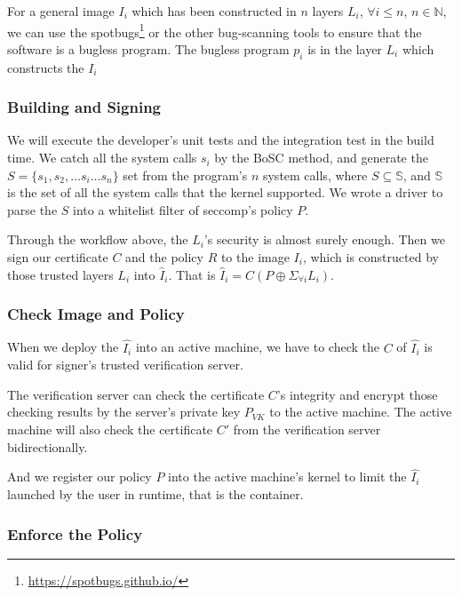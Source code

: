 For a general image $I_i$ which has been constructed in $n$ layers $L_i$,
$\forall i \le n$, $n \in \mathbb{N}$, we can use the spotbugs\footnote{\url{https://spotbugs.github.io/}}
or the other bug-scanning tools to ensure that the software is a bugless program.
The bugless program $p_i$ is in the layer $L_i$ which constructs the $I_i$

\subsubsection{Building and Signing}

We will execute the developer's unit tests and the integration test in the build time.
We catch all the system calls $s_i$ by the BoSC \cite{1495942} method,
and generate the $S = \{s_1, s_2, \dots s_i \dots s_n\}$ set from the
program's $n$ system calls, where $S \subseteq \mathbb{S}$, and $\mathbb{S}$ is the set of
all the system calls that the kernel supported.  We wrote a driver to parse the $S$ into
a whitelist filter of seccomp's policy $P$.


Through the workflow above, the $L_i$'s security is almost surely enough.
Then we sign our certificate $C$ and the policy $R$ to the image $I_i$, which
is constructed by those trusted layers $L_i$ into $\hat I_{i}$. That is
$\hat I_{i} = C(P \oplus \Sigma_{\forall i} L_i)$.

\subsubsection{Check Image and Policy}
When we deploy the $\hat{I_i}$ into an active machine, we have to check the $C$ of
$\hat{I_i}$ is valid for signer's trusted verification server.

The verification server can check the certificate $C$'s integrity and encrypt those
checking results by the server's private key $P_{VK}$ to the active machine. The active
machine will also check the certificate $C'$ from the verification server bidirectionally.

And we register our policy $P$ into the active machine's kernel to limit the $\hat{I_i}$
launched by the user in runtime, that is the container.

\subsubsection{Enforce the Policy}

